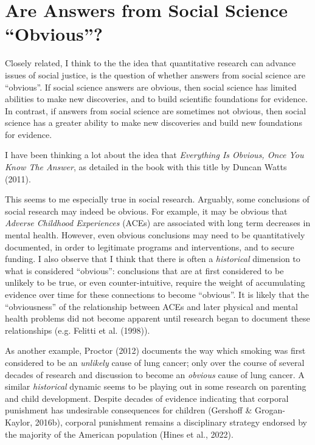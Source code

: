 \documentclass[
  letterpaper,
  DIV=11,
  numbers=noendperiod]{scrreprt}
\begin{document}
\section{Are Answers from Social Science
``Obvious''?}\label{sec-obvious}

Closely related, I think to the the idea that quantitative research can
advance issues of social justice, is the question of whether answers
from social science are ``obvious''. If social science answers are
obvious, then social science has limited abilities to make new
discoveries, and to build scientific foundations for evidence. In
contrast, if answers from social science are sometimes not obvious, then
social science has a greater ability to make new discoveries and build
new foundations for evidence.

I have been thinking a lot about the idea that \emph{Everything Is
Obvious, Once You Know The Answer}, as detailed in the book with this
title by Duncan Watts (2011). 

This seems to me especially true in social research. Arguably, some
conclusions of social research may indeed be obvious. For example, it
may be obvious that \emph{Adverse Childhood Experiences} (ACEs) are
associated with long term decreases in mental health. However, even
obvious conclusions may need to be quantitatively documented, in order
to legitimate programs and interventions, and to secure funding. I also
observe that I think that there is often a \emph{historical} dimension
to what is considered ``obvious'': conclusions that are at first
considered to be unlikely to be true, or even counter-intuitive, require
the weight of accumulating evidence over time for these connections to
become ``obvious''. It is likely that the ``obviousness'' of the
relationship between ACEs and later physical and mental health problems
did not become apparent until research began to document these
relationships (e.g. Felitti et al. (1998)).

As another example, Proctor (2012) documents the way which smoking was
first considered to be an \emph{unlikely} cause of lung cancer; only
over the course of several decades of research and discussion to become
an \emph{obvious} cause of lung cancer. A similar \emph{historical}
dynamic seems to be playing out in some research on parenting and child
development. Despite decades of evidence indicating that corporal
punishment has undesirable consequences for children (Gershoff \&
Grogan-Kaylor, 2016b), corporal punishment remains a disciplinary
strategy endorsed by the majority of the American population (Hines et
al., 2022).
\end{document}
